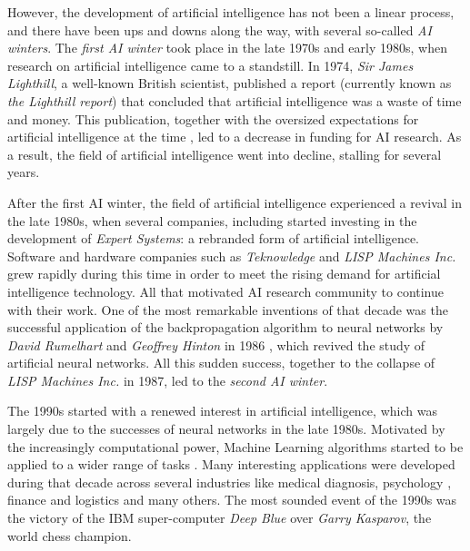 However, the development of artificial intelligence has not been a linear process, and there have been ups and downs along the way, with several so-called \textit{AI winters}. The \textit{first AI winter} took place in the late 1970s and early 1980s, when research on artificial intelligence came to a standstill. In 1974, \textit{Sir James Lighthill}, a well-known British scientist, published a report \cite{lighthillReport} (currently known as \textit{the Lighthill report}) that concluded that artificial intelligence was a waste of time and money. This publication, together with the oversized expectations for artificial intelligence at the time \cite{russellNorvig}, led to a decrease in funding for AI research. As a result, the field of artificial intelligence went into decline, stalling for several years.

After the first AI winter, the field of artificial intelligence experienced a revival in the late 1980s, when several companies, including started investing in the development of \textit{Expert Systems}: a rebranded form of artificial intelligence. Software and hardware companies such as \textit{Teknowledge} and \textit{LISP Machines Inc.} grew rapidly during this time in order to meet the rising demand for artificial intelligence technology. All that motivated AI research community to continue with their work. One of the most remarkable inventions of that decade was the successful application of the backpropagation algorithm to neural networks by \textit{David Rumelhart} and \textit{Geoffrey Hinton} in 1986 \cite{hinton1986}, which revived the study of artificial neural networks. All this sudden success, together to the collapse of \textit{LISP Machines Inc.} in 1987, led to the \textit{second AI winter}.

The 1990s started with a renewed interest in artificial intelligence, which was largely due to the successes of neural networks in the late 1980s. Motivated by the increasingly computational power, Machine Learning algorithms started to be applied to a wider range of tasks \cite{Tesauro:1995}. Many interesting applications were developed during that decade across several industries like medical diagnosis\cite{declaris1991, Klein1991, punch1992, Cinar1999}, psychology \cite{Dorrer1995, denby1999, Ogawa1999, Perlovsky1999}, finance and logistics \cite{Lipshutz1991, Benaroch1991, Johnson1991, Falas1994} and many others\cite{Smithers1993, Yoo1994, Mashaly1994, Koyma1998}. The most sounded event of the 1990s was the victory of the IBM super-computer \textit{Deep Blue} \cite{Campbell2002} over \textit{Garry Kasparov}, the world chess champion.


